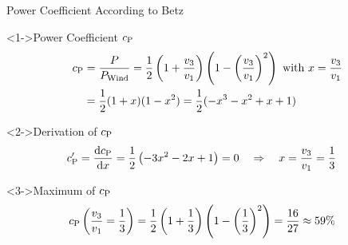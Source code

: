\begin{frame}{Power Coefficient According to Betz} 
\setlength{\abovedisplayskip}{0pt}
\setlength{\belowdisplayskip}{1pt}
	\begin{block}<1->{Power Coefficient $c_{\textnormal{P}}$}
		\begin{align*}
		c_{\textnormal{P}} & = \frac{P}{P_{\textnormal{Wind}}} = \frac{1}{2} \left( 1 + \frac{v_3}{v_1} \right) \left( 1 - \left( \frac{v_3}{v_1} \right)^2 \right) \text{\ with\ } x=\frac{v_3}{v_1}\\
		& = \frac{1}{2} (1+x)(1-x^2)=\frac{1}{2}(-x^3-x^2+x+1)
		\end{align*}
	\end{block}	
	\vspace*{-1pt}
	\begin{block}<2->{Derivation of $c_{\textnormal{P}}$}
		\begin{align*}
		c_{\textnormal{P}}' &= \frac{\textnormal{d} c_{\textnormal{P}}}{\textnormal{d}x} = \frac{1}{2} \left( - 3 x^2 - 2 x +1 \right) = 0 \quad \Rightarrow \quad x=\frac{v_3}{v_1} = \frac{1}{3}
		\end{align*}
	\end{block}
	\vspace*{-1pt}
	\begin{block}<3->{Maximum of $c_{\textnormal{P}}$}
		\begin{align*}
		c_{\textnormal{P}} \left( \frac{v_3}{v_1} = \frac{1}{3} \right) &= \frac{1}{2} \left( 1 + \frac{1}{3} \right) \left( 1 - \left( \frac{1}{3} \right)^2 \right) = \frac{16}{27} \approx 59\%
		\end{align*}
	\end{block}
\end{frame}
